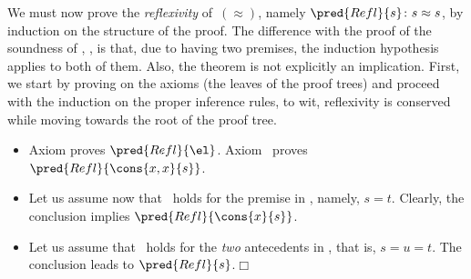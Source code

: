 We must now prove the \emph{reflexivity} of~\((\approx)\),
namely \(\pred{Refl}{s} \colon s \approx
s\), by induction on the structure of the
proof. The difference with the proof of the soundness of
, , is that,
due to  having two premises, the induction hypothesis
applies to both of them. Also, the theorem is not explicitly an
implication. First, we start by proving  on the axioms
(the leaves of the proof trees) and proceed with the induction on the
proper inference rules, to wit, reflexivity is conserved while moving
towards the root of the proof tree.
\begin{itemize}

  \item Axiom  proves \(\pred{Refl}{\el}\).
    Axiom~ proves \(\pred{Refl}{\cons{x,x}{s}}\).

  \item Let us assume now that ~holds for the premise
    in , namely, \(s = t\). Clearly, the conclusion
    implies \(\pred{Refl}{\cons{x}{s}}\).

  \item Let us assume that ~holds for the \emph{two}
    antecedents in , that is, \(s=u=t\). The conclusion
    leads to
    \(\pred{Refl}{s}\).\hfill\(\Box\)

\end{itemize}

